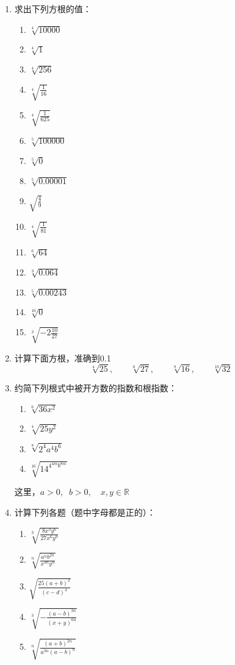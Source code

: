 \begin{ex}
\begin{enumerate}
    \item 求出下列方根的值：
    \begin{multicols}{2}
\begin{enumerate}
    \item $\sqrt[4]{10000}$
    \item $\sqrt[4]{1}$
    \item $\sqrt[4]{256}$
    \item $\sqrt[4]{\frac{1}{16}}$
    \item $\sqrt[4]{\frac{1}{625}}$
    \item $\sqrt[5]{100000}$
    \item $\sqrt[5]{0}$
    \item $\sqrt[5]{0.00001}$
    \item $\sqrt{\frac{4}{9}}$
    \item $\sqrt[4]{\frac{1}{81}}$
    \item $\sqrt[6]{64}$
    \item $\sqrt[3]{0.064}$
    \item $\sqrt[5]{0.00243}$
    \item $\sqrt[10]{0}$
    \item $\sqrt[3]{-2 \frac{10}{27}}$
\end{enumerate}        
    \end{multicols}

\item 计算下面方根，准确到0.1
\[\sqrt[4]{25},\qquad \sqrt[6]{27},\qquad \sqrt[8]{16},\qquad \sqrt[10]{32} \]

\item 约简下列根式中被开方数的指数和根指数：
\begin{multicols}{2}
\begin{enumerate}
    \item $\sqrt[6]{36 x^{2}}$
    \item $\sqrt[4]{25 y^{2}}$
    \item $\sqrt[8]{2^{4} a^{4} b^{6}}$
    \item $\sqrt[16]{14^{4^{4m} b^{8m}}}$
\end{enumerate}
\end{multicols}
这里，$a>0,\;\; b>0,\quad x,y\in\mathbb{R}$


\item 计算下列各题（题中字母都是正的）：
\begin{multicols}{2}
    \begin{enumerate}
    \item $\sqrt[3]{\frac{8 x^{3} y^{6}}{27 x^{6} y^{9}}}$
    \item $\sqrt[n]{\frac{a^{n} b^{2n}}{x^{3 n} y^{n}}}$
    \item $\sqrt{\frac{25(a+b)^{2}}{(c-d)^{4}}}$
    \item $\sqrt[3]{-\frac{(a-b)^{3 n}}{(x+y)^{6n}}}$
    \item $\sqrt[n]{\frac{(a+b)^{2 n}}{a^{3 n}(a-b)^{n}}}$
\end{enumerate}
\end{multicols}


\end{enumerate}
\end{ex}
